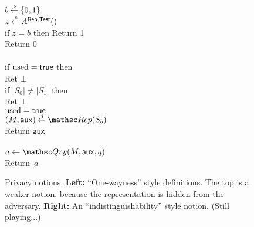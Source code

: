 \begin{figure}[htp]
\centering
{}
%
{
{
\\
$b {\:\stackrel{{\scriptscriptstyle \hspace{0.2em}\$}} {\leftarrow}\:} \{0,1\}$\\
$z {\:\stackrel{{\scriptscriptstyle \hspace{0.2em}\$}} {\leftarrow}\:} A^{\mathsf{Rep},\mathsf{Test}}()$\\
if $z = b$ then Return 1\\
Return 0\\
}
%
{
\\
if $\mathrm{used}=\mathsf{true}$ then \\
\nudge Ret $\bot$\\
if $|S_0|\neq|S_1|$ then \\
\nudge Ret $\bot$\\
$\mathrm{used}=\mathsf{true}$\\
$(M,\aux) \getsr \Rep(S_b)$\\
Return ${\sf aux}$\\

\medskip
{}\\
$a \gets \Qry(M,\aux,q)$\\
Return~$a$\\
}
}
\caption{Privacy notions. {\bf Left:} ``One-wayness'' style
  definitions. The top is a weaker notion, because the representation
  is hidden from the adversary. {\bf Right:} An
  ``indistinguishability'' style notion. (Still playing...)} 
\label{fig:privacy}
\end{figure}

